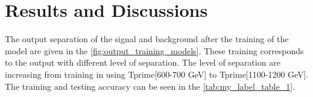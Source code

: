 \chapter{\label{R_D}Results and Discussions}
The output separation of the signal and background after the training of the model are given in the \autoref{fig:output_training_models}. These training corresponds to the output with different level of separation. The level of separation are increasing from training in using Tprime[600-700 GeV] to  Tprime[1100-1200 GeV]. The training and testing accuracy can be seen in the \autoref{tab:my_label_table_1}.









